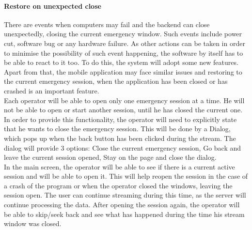\documentclass{article}
\begin{document}
		\paragraph{Restore on unexpected close}
		There are events when computers may fail and the backend can close unexpectedly, closing the current emergency window. Such events include power cut, software bug or any hardware failure. As other actions can be taken in order to minimise the possibility of such event happening, the software by itself has to be able to react to it too. To do this, the system will adopt some new features.\\

Apart from that, the mobile application may face similar issues and restoring to the current emergency session, when the application has been closed or has crashed is an important feature.\\

Each operator will be able to open only one emergency session at a time. He will not be able to open or start another session, until he has closed the current one. In order to provide this functionality, the operator will need to explicitly state that he wants to close the emergency session. This will be done by a Dialog, which pops up when the back button has been clicked during the stream. The dialog will provide 3 options: Close the current emergency session, Go back and leave the current session opened, Stay on the page and close the dialog.\\

In the main screen, the operator will be able to see if there is a current active session and will be able to open it. This will help reopen the session in the case of a crash of the program or when the operator closed the windows, leaving the session open. The user can continue streaming during this time, as the server will continue processing the data. After opening the session again, the operator will be able to skip/seek back and see what has happened during the time his stream window was closed.\\
\end{document}
